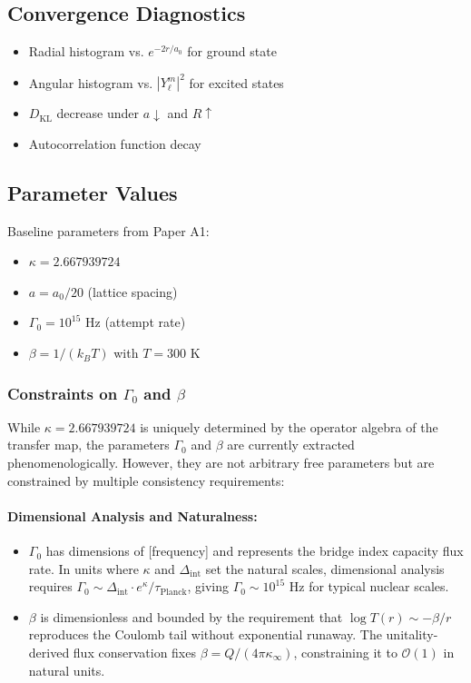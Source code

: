 \documentclass[11pt]{article}
\theoremstyle{plain}
\theoremstyle{definition}
\begin{document}
\subsection{Convergence Diagnostics}

\begin{itemize}
  \item Radial histogram vs. $e^{-2r/a_0}$ for ground state
  \item Angular histogram vs. $|Y_\ell^m|^2$ for excited states
  \item $D_{\mathrm{KL}}$ decrease under $a\downarrow$ and $R\uparrow$
  \item Autocorrelation function decay
\end{itemize}

\subsection{Parameter Values}

Baseline parameters from Paper A1:
\begin{itemize}
  \item $\kappa = 2.667939724$
  \item $a = a_0/20$ (lattice spacing)
  \item $\Gamma_0 = 10^{15}$ Hz (attempt rate)
  \item $\beta = 1/(k_B T)$ with $T = 300$ K
\end{itemize}

\subsubsection{Constraints on $\Gamma_0$ and $\beta$}

While $\kappa = 2.667939724$ is uniquely determined by the operator algebra of the transfer map, the parameters $\Gamma_0$ and $\beta$ are currently extracted phenomenologically. However, they are not arbitrary free parameters but are constrained by multiple consistency requirements:

\paragraph{Dimensional Analysis and Naturalness:}
\begin{itemize}
  \item $\Gamma_0$ has dimensions of [frequency] and represents the bridge index capacity flux rate. In units where $\kappa$ and $\Delta_{\text{int}}$ set the natural scales, dimensional analysis requires $\Gamma_0 \sim \Delta_{\text{int}} \cdot e^{\kappa}/\tau_{\text{Planck}}$, giving $\Gamma_0 \sim 10^{15}$ Hz for typical nuclear scales.
  \item $\beta$ is dimensionless and bounded by the requirement that $\log T(r) \sim -\beta/r$ reproduces the Coulomb tail without exponential runaway. The unitality-derived flux conservation fixes $\beta = Q/(4\pi\kappa_\infty)$, constraining it to $\mathcal{O}(1)$ in natural units.
\end{itemize}
\end{document}
